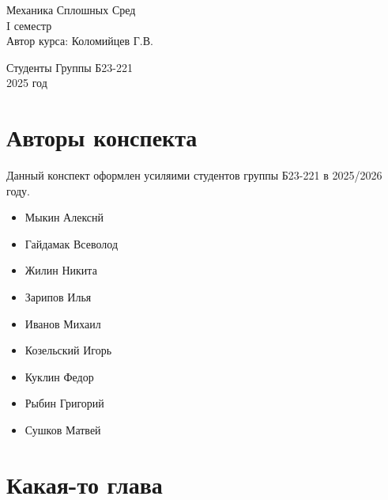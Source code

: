 \documentclass[a4paper, oneside, 14pt]{extreport}
\begin{document}
        \begin{titlepage}
        \thispagestyle{empty}        %

        \vspace*{\fill}               %
        \begin{center}
        {\Huge Механика Сплошных Сред\\[0.5em]
            I семестр}\\[1em]
            {\LARGE Автор курса: Коломийцев Г.В.}
        \end{center}
        \vspace*{\fill}               %

        \begin{center}
            {\large
                Студенты Группы Б23-221\\
                2025 год               
            }
 
        \end{center}

    \end{titlepage}
    \tableofcontents
    \newpage
    \chapter*{Авторы конспекта}
    Данный конспект оформлен усиляими студентов группы Б23-221 в 2025/2026 году. 
    \begin{itemize}
        \item Мыкин Алекснй
        \item Гайдамак Всеволод
        \item Жилин Никита
        \item Зарипов Илья
        \item Иванов Михаил
        \item Козельский Игорь
        \item Куклин Федор
        \item Рыбин Григорий
        \item Сушков Матвей 
    \end{itemize}
    
    
    \chapter{Какая-то глава}
    
    
    
\end{document}

